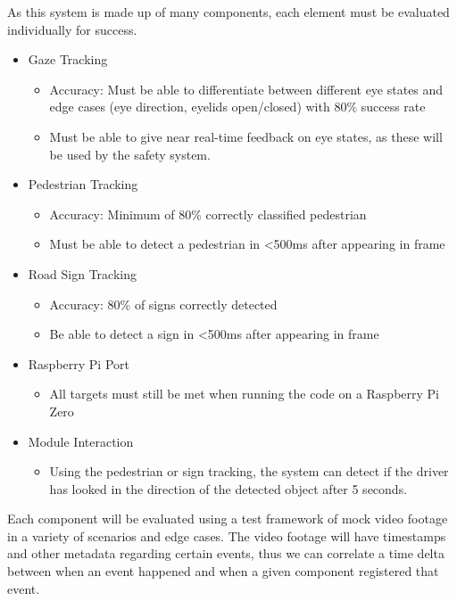 As this system is made up of many components, each element must be evaluated individually for success.
\begin{itemize}
    \item Gaze Tracking
        \begin{itemize}
            \item Accuracy: Must be able to differentiate between different eye states and edge cases (eye direction, eyelids open/closed) with $80\%$ success rate
            \item Must be able to give near real-time feedback on eye states, as these will be used by the safety system.
        \end{itemize}
    \item Pedestrian Tracking
        \begin{itemize}
            \item Accuracy: Minimum of 80\% correctly classified pedestrian
            \item Must be able to detect a pedestrian in <500ms after appearing in frame
        \end{itemize}
    \item Road Sign Tracking
        \begin{itemize}
            \item Accuracy: 80\% of signs correctly detected
            \item Be able to detect a sign in <500ms after appearing in frame
        \end{itemize}
    \item Raspberry Pi Port
        \begin{itemize}
            \item All targets must still be met when running the code on a Raspberry Pi Zero
        \end{itemize}
    \item Module Interaction
        \begin{itemize}
            \item Using the pedestrian or sign tracking, the system can detect if the driver has looked in the direction of the detected object after 5 seconds.
        \end{itemize}
\end{itemize}

Each component will be evaluated using a test framework of mock video footage in a variety of scenarios and edge cases. The video footage will have timestamps and other metadata regarding certain events, thus we can correlate a time delta between when an event happened and when a given component registered that event.